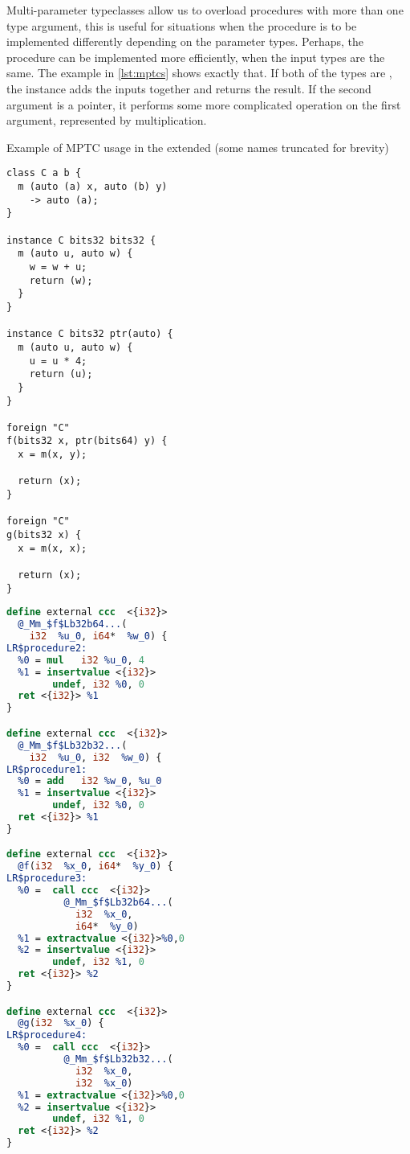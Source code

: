 Multi-parameter typeclasses allow us to overload procedures with more than one type argument, this is useful for situations when the procedure is to be implemented differently depending on the parameter types. Perhaps, the procedure can be implemented more efficiently, when the input types are the same. The example in \cref{lst:mptcs} shows exactly that. If both of the types are , the instance adds the inputs together and returns the result. If the second argument is a pointer, it performs some more complicated operation on the first argument, represented by multiplication.
\begin{listing}
    \small
    \caption{Example of MPTC usage in the extended \cmm (some names truncated for brevity)}
    \label{lst:mptcs}
    \begin{center}
    \begin{minipage}{0.5\linewidth}
    \begin{lstlisting}
class C a b {
  m (auto (a) x, auto (b) y)
    -> auto (a);
}

instance C bits32 bits32 {
  m (auto u, auto w) {
    w = w + u;
    return (w);
  }
}

instance C bits32 ptr(auto) {
  m (auto u, auto w) {
    u = u * 4;
    return (u);
  }
}

foreign "C"
f(bits32 x, ptr(bits64) y) {
  x = m(x, y);

  return (x);
}

foreign "C"
g(bits32 x) {
  x = m(x, x);

  return (x);
}
    \end{lstlisting}
    \end{minipage}%
    \begin{minipage}{0.5\linewidth}
    \begin{lstlisting}[language=LLVM]
define external ccc  <{i32}>
  @_Mm_$f$Lb32b64...(
    i32  %u_0, i64*  %w_0) {
LR$procedure2:
  %0 = mul   i32 %u_0, 4
  %1 = insertvalue <{i32}>
        undef, i32 %0, 0
  ret <{i32}> %1
}

define external ccc  <{i32}>
  @_Mm_$f$Lb32b32...(
    i32  %u_0, i32  %w_0) {
LR$procedure1:
  %0 = add   i32 %w_0, %u_0
  %1 = insertvalue <{i32}>
        undef, i32 %0, 0
  ret <{i32}> %1
}

define external ccc  <{i32}>
  @f(i32  %x_0, i64*  %y_0) {
LR$procedure3:
  %0 =  call ccc  <{i32}>
          @_Mm_$f$Lb32b64...(
            i32  %x_0,
            i64*  %y_0)
  %1 = extractvalue <{i32}>%0,0
  %2 = insertvalue <{i32}>
        undef, i32 %1, 0
  ret <{i32}> %2
}

define external ccc  <{i32}>
  @g(i32  %x_0) {
LR$procedure4:
  %0 =  call ccc  <{i32}>
          @_Mm_$f$Lb32b32...(
            i32  %x_0,
            i32  %x_0)
  %1 = extractvalue <{i32}>%0,0
  %2 = insertvalue <{i32}>
        undef, i32 %1, 0
  ret <{i32}> %2
}
    \end{lstlisting}
    \end{minipage}
    \end{center}
\end{listing}

